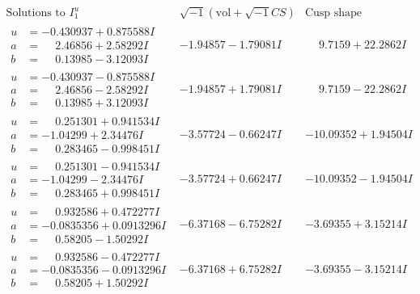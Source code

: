 \documentclass[1p]{elsarticle_modified}
\theoremstyle{definition}
\newcommand{\I}{\sqrt{-1}}
\begin{document}
$$\begin{array}{c|c|c}  
\text{Solutions to }I^u_{1}& \I (\text{vol} + \sqrt{-1}CS) & \text{Cusp shape}\\
 \hline 
\begin{aligned}
u &= -0.430937 + 0.875588 I \\
a &= \phantom{-}2.46856 + 2.58292 I \\
b &= \phantom{-}0.13985 - 3.12093 I\end{aligned}
 & -1.94857 - 1.79081 I & \phantom{-}9.7159 + 22.2862 I \\ \hline\begin{aligned}
u &= -0.430937 - 0.875588 I \\
a &= \phantom{-}2.46856 - 2.58292 I \\
b &= \phantom{-}0.13985 + 3.12093 I\end{aligned}
 & -1.94857 + 1.79081 I & \phantom{-}9.7159 - 22.2862 I \\ \hline\begin{aligned}
u &= \phantom{-}0.251301 + 0.941534 I \\
a &= -1.04299 + 2.34476 I \\
b &= \phantom{-}0.283465 - 0.998451 I\end{aligned}
 & -3.57724 - 0.66247 I & -10.09352 + 1.94504 I \\ \hline\begin{aligned}
u &= \phantom{-}0.251301 - 0.941534 I \\
a &= -1.04299 - 2.34476 I \\
b &= \phantom{-}0.283465 + 0.998451 I\end{aligned}
 & -3.57724 + 0.66247 I & -10.09352 - 1.94504 I \\ \hline\begin{aligned}
u &= \phantom{-}0.932586 + 0.472277 I \\
a &= -0.0835356 + 0.0913296 I \\
b &= \phantom{-}0.58205 - 1.50292 I\end{aligned}
 & -6.37168 - 6.75282 I & -3.69355 + 3.15214 I \\ \hline\begin{aligned}
u &= \phantom{-}0.932586 - 0.472277 I \\
a &= -0.0835356 - 0.0913296 I \\
b &= \phantom{-}0.58205 + 1.50292 I\end{aligned}
 & -6.37168 + 6.75282 I & -3.69355 - 3.15214 I \\ \hline\begin{aligned}

\end{aligned}
\end{array}$$
\end{document}
